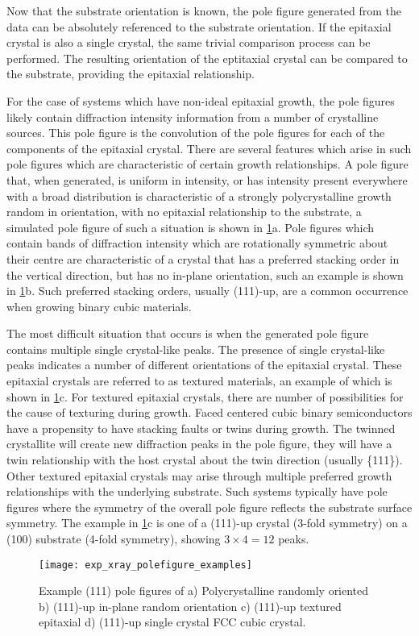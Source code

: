 Now that the substrate orientation is known, the pole figure generated from the data can be absolutely referenced to the substrate orientation.
If the epitaxial crystal is also a single crystal, the same trivial comparison process can be performed.
The resulting orientation of the eptitaxial crystal can be compared to the substrate, providing the epitaxial relationship.

For the case of systems which have non-ideal epitaxial growth, the pole figures likely contain diffraction intensity information from a number of crystalline sources.
This pole figure is the convolution of the pole figures for each of the components of the epitaxial crystal.
There are several features which arise in such pole figures which are characteristic of certain growth relationships.
A pole figure that, when generated, is uniform in intensity, or has intensity present everywhere with a broad distribution is characteristic of a strongly polycrystalline growth random in orientation, with no epitaxial relationship to the substrate, a simulated pole figure of such a situation is shown in \cref{fig:exp_xray_polefigure_examples}a.
Pole figures which contain bands of diffraction intensity which are rotationally symmetric about their centre are characteristic of a crystal that has a preferred stacking order in the vertical direction, but has no in-plane orientation, such an example is shown in \cref{fig:exp_xray_polefigure_examples}b.
Such preferred stacking orders, usually (111)-up, are a common occurrence when growing binary cubic materials.

The most difficult situation that occurs is when the generated pole figure contains multiple single crystal-like peaks.
The presence of single crystal-like peaks indicates a number of different orientations of the epitaxial crystal.
These epitaxial crystals are referred to as textured materials, an example of which is shown in \cref{fig:exp_xray_polefigure_examples}c.
For textured epitaxial crystals, there are number of possibilities for the cause of texturing during growth.
Faced centered cubic binary semiconductors have a propensity to have stacking faults or twins during growth.
The twinned crystallite will create new diffraction peaks in the pole figure, they will have a twin relationship with the host crystal about the twin direction (usually \{111\}).
Other textured epitaxial crystals may arise through multiple preferred growth relationships with the underlying substrate.
Such systems typically have pole figures where the symmetry of the overall pole figure reflects the substrate surface symmetry.
The example in \cref{fig:exp_xray_polefigure_examples}c is one of a (111)-up crystal (3-fold symmetry) on a (100) substrate (4-fold symmetry), showing \(3\times 4=12\) peaks.
\begin{figure}
 \centering \texttt{[image: exp\_xray\_polefigure\_examples]}
 \caption[Example simulated pole figures]{\label{fig:exp_xray_polefigure_examples}Example (111) pole figures of a) Polycrystalline randomly oriented b) (111)-up in-plane random orientation c) (111)-up textured epitaxial d) (111)-up single crystal FCC cubic crystal.}
\end{figure}

